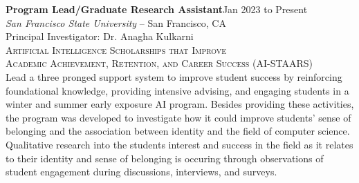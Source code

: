 \documentclass[hidelinks, 10pt]{article}
\begin{document}
{{\begin{minipage}[ct]{0.9\linewidth}
\textbf{Program Lead/Graduate Research Assistant}\hfill Jan 2023 to Present\\
\emph{San Francisco State University} -- San Francisco, CA\\
Principal Investigator: Dr. Anagha Kulkarni\\
{\textsc{Artificial Intelligence Scholarships that Improve \\Academic Achievement, Retention, and Career Success (AI-STAARS)}}
\vspace{1mm}\\
Lead a three pronged support system to improve student success by reinforcing
foundational knowledge, providing intensive advising, and engaging students in a
winter and summer early exposure AI program.  Besides providing these
activities, the program was developed to investigate how it could improve
students' sense of belonging and the association between identity and the field
of computer science.  Qualitative research into the students interest and
success in the field as it relates to their identity and sense of belonging is
occuring through observations of student engagement during discussions,
interviews, and surveys.
\end{minipage}

\vspace{4mm}

}}
\end{document}
